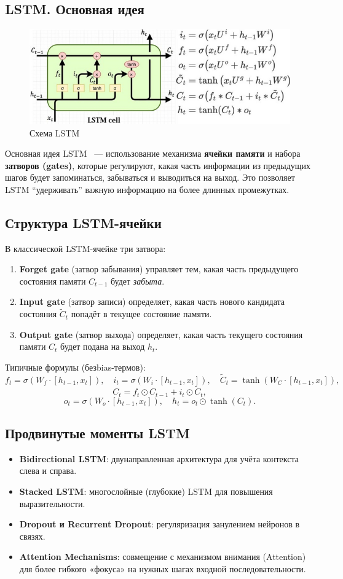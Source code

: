 \subsection{LSTM. Основная идея}

\begin{figure}[h]
	\centering
	\includegraphics[width=0.6\linewidth]{chapters/neural/images/lstm.png}
	\caption{Схема LSTM}
	\label{img:lstm}
\end{figure}
Основная идея LSTM~\cite{hochreiter1997long} --- использование механизма \textbf{ячейки памяти} и набора \textbf{затворов (gates)}, которые регулируют, какая часть информации из предыдущих шагов будет запоминаться, забываться и выводиться на выход. Это позволяет LSTM ``удерживать'' важную информацию на более длинных промежутках.

\subsection{Структура LSTM-ячейки}
В классической LSTM-ячейке три затвора:
\begin{enumerate}
	\item \textbf{Forget gate} (затвор забывания) управляет тем, какая часть предыдущего состояния памяти $C_{t-1}$ будет \textit{забыта}.
	\item \textbf{Input gate} (затвор записи) определяет, какая часть нового кандидата состояния $\tilde{C}_t$ попадёт в текущее состояние памяти.
	\item \textbf{Output gate} (затвор выхода) определяет, какая часть текущего состояния памяти $C_t$ будет подана на выход $h_t$.
\end{enumerate}

Типичные формулы (безbias-термов):
\[
	f_t = \sigma(W_f \cdot [h_{t-1}, x_t]), \quad
	i_t = \sigma(W_i \cdot [h_{t-1}, x_t]), \quad
	\tilde{C}_t = \tanh(W_C \cdot [h_{t-1}, x_t]),
\]
\[
	C_t = f_t \odot C_{t-1} + i_t \odot \tilde{C}_t,
\]
\[
	o_t = \sigma(W_o \cdot [h_{t-1}, x_t]), \quad
	h_t = o_t \odot \tanh(C_t).
\]

\subsection{Продвинутые моменты LSTM}
\begin{itemize}
	\item \textbf{Bidirectional LSTM}: двунаправленная архитектура для учёта контекста слева и справа.
	\item \textbf{Stacked LSTM}: многослойные (глубокие) LSTM для повышения выразительности.
	\item \textbf{Dropout и Recurrent Dropout}: регуляризация занулением нейронов в связях.
	\item \textbf{Attention Mechanisms}: совмещение с механизмом внимания (Attention) для более гибкого «фокуса» на нужных шагах входной последовательности.
\end{itemize}

